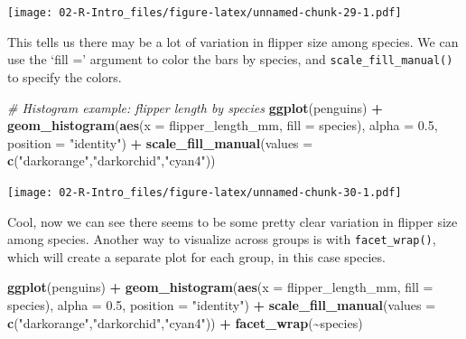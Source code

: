 \documentclass[
]{book}
\newenvironment{Shaded}{\begin{snugshade}}{\end{snugshade}}
\newcommand{\AttributeTok}[1]{\textcolor[rgb]{0.13,0.29,0.53}{#1}}
\newcommand{\CommentTok}[1]{\textcolor[rgb]{0.56,0.35,0.01}{\textit{#1}}}
\newcommand{\FloatTok}[1]{\textcolor[rgb]{0.00,0.00,0.81}{#1}}
\newcommand{\FunctionTok}[1]{\textcolor[rgb]{0.13,0.29,0.53}{\textbf{#1}}}
\newcommand{\NormalTok}[1]{#1}
\newcommand{\SpecialCharTok}[1]{\textcolor[rgb]{0.81,0.36,0.00}{\textbf{#1}}}
\newcommand{\StringTok}[1]{\textcolor[rgb]{0.31,0.60,0.02}{#1}}
\begin{document}
\texttt{[image: 02-R-Intro\_files/figure-latex/unnamed-chunk-29-1.pdf]}

This tells us there may be a lot of variation in flipper size among species. We can use the `fill =' argument to color the bars by species, and \texttt{scale\_fill\_manual()} to specify the colors.

\begin{Shaded}
\begin{Highlighting}[]
\CommentTok{\# Histogram example: flipper length by species}
\FunctionTok{ggplot}\NormalTok{(penguins) }\SpecialCharTok{+}
  \FunctionTok{geom\_histogram}\NormalTok{(}\FunctionTok{aes}\NormalTok{(}\AttributeTok{x =}\NormalTok{ flipper\_length\_mm, }\AttributeTok{fill =}\NormalTok{ species), }\AttributeTok{alpha =} \FloatTok{0.5}\NormalTok{, }\AttributeTok{position =} \StringTok{"identity"}\NormalTok{) }\SpecialCharTok{+}
  \FunctionTok{scale\_fill\_manual}\NormalTok{(}\AttributeTok{values =} \FunctionTok{c}\NormalTok{(}\StringTok{"darkorange"}\NormalTok{,}\StringTok{"darkorchid"}\NormalTok{,}\StringTok{"cyan4"}\NormalTok{))}
\end{Highlighting}
\end{Shaded}

\texttt{[image: 02-R-Intro\_files/figure-latex/unnamed-chunk-30-1.pdf]}

Cool, now we can see there seems to be some pretty clear variation in flipper size among species. Another way to visualize across groups is with \texttt{facet\_wrap()}, which will create a separate plot for each group, in this case species.

\begin{Shaded}
\begin{Highlighting}[]
\FunctionTok{ggplot}\NormalTok{(penguins) }\SpecialCharTok{+}
  \FunctionTok{geom\_histogram}\NormalTok{(}\FunctionTok{aes}\NormalTok{(}\AttributeTok{x =}\NormalTok{ flipper\_length\_mm, }\AttributeTok{fill =}\NormalTok{ species), }\AttributeTok{alpha =} \FloatTok{0.5}\NormalTok{, }\AttributeTok{position =} \StringTok{"identity"}\NormalTok{) }\SpecialCharTok{+}
  \FunctionTok{scale\_fill\_manual}\NormalTok{(}\AttributeTok{values =} \FunctionTok{c}\NormalTok{(}\StringTok{"darkorange"}\NormalTok{,}\StringTok{"darkorchid"}\NormalTok{,}\StringTok{"cyan4"}\NormalTok{)) }\SpecialCharTok{+}
  \FunctionTok{facet\_wrap}\NormalTok{(}\SpecialCharTok{\textasciitilde{}}\NormalTok{species)}
\end{Highlighting}
\end{Shaded}
\end{document}
